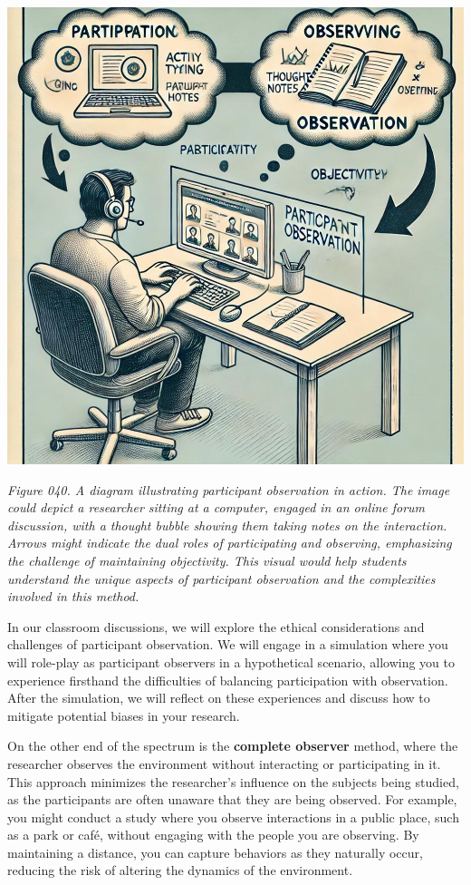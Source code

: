 \documentclass[
]{book}
\begin{document}
\includegraphics[width=1\linewidth,height=\textheight,keepaspectratio]{images/fig040.jpg}

\emph{Figure 040. A diagram illustrating participant observation in action. The image could depict a researcher sitting at a computer, engaged in an online forum discussion, with a thought bubble showing them taking notes on the interaction. Arrows might indicate the dual roles of participating and observing, emphasizing the challenge of maintaining objectivity. This visual would help students understand the unique aspects of participant observation and the complexities involved in this method.}

In our classroom discussions, we will explore the ethical considerations and challenges of participant observation. We will engage in a simulation where you will role-play as participant observers in a hypothetical scenario, allowing you to experience firsthand the difficulties of balancing participation with observation. After the simulation, we will reflect on these experiences and discuss how to mitigate potential biases in your research.

On the other end of the spectrum is the \textbf{complete observer} method, where the researcher observes the environment without interacting or participating in it. This approach minimizes the researcher's influence on the subjects being studied, as the participants are often unaware that they are being observed. For example, you might conduct a study where you observe interactions in a public place, such as a park or café, without engaging with the people you are observing. By maintaining a distance, you can capture behaviors as they naturally occur, reducing the risk of altering the dynamics of the environment.
\end{document}
